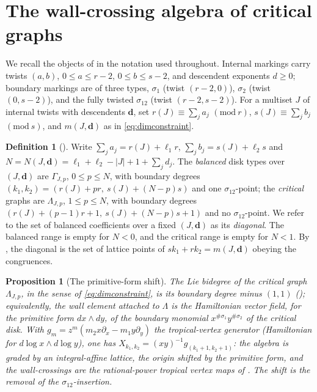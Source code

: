 \documentclass[11pt]{amsart}
\newtheorem{proposition}[theorem]{Proposition}
\theoremstyle{definition}
\newtheorem{definition}[theorem]{Definition}
\theoremstyle{remark}
\begin{document}
\section{The wall-crossing algebra of critical graphs}
\label{sec:algebra}

We recall the objects of \cite[\S2.4, \S4.3]{GKT} in the notation used throughout.
Internal markings carry twists $(a,b)$, $0\le a\le r-2$, $0\le b\le s-2$, and
descendent exponents $d\ge0$; boundary markings are of three types,
$\sigma_{1}$ (twist $(r{-}2,0)$), $\sigma_{2}$ (twist $(0,s{-}2)$), and the fully
twisted $\sigma_{12}$ (twist $(r{-}2,s{-}2)$). For a multiset $J$ of internal
twists with descendents $\mathbf d$, set $r(J)\equiv\sum_{j}a_{j}$
$(\mathrm{mod}\ r)$, $s(J)\equiv\sum_{j}b_{j}$ $(\mathrm{mod}\ s)$, and
$m(J,\mathbf d)$ as in \eqref{eq:dimconstraint}.

\begin{definition}[{\cite[Not.~2.40]{GKT}}]
\label{def:diagonal}
Write $\sum_{j}a_{j}=r(J)+\ell_{1}r$, $\sum_{j}b_{j}=s(J)+\ell_{2}s$ and
$N=N(J,\mathbf d)=\ell_{1}+\ell_{2}-|J|+1+\sum_{j}d_{j}$. The \emph{balanced}
disk types over $(J,\mathbf d)$ are $\Gamma_{J,p}$, $0\le p\le N$, with boundary
degrees $(k_{1},k_{2})=(r(J)+pr,\ s(J)+(N{-}p)s)$ and one $\sigma_{12}$-point; the
\emph{critical} graphs are $\Lambda_{J,p}$, $1\le p\le N$, with boundary degrees
$(r(J)+(p{-}1)r+1,\ s(J)+(N{-}p)s+1)$ and no $\sigma_{12}$-point. We refer to the
set of balanced coefficients over a fixed $(J,\mathbf d)$ as its \emph{diagonal}.
The balanced range is empty for $N<0$, and the critical range is empty for
$N<1$. By \cite[Prop.~2.31]{GKT}, the diagonal is the set of lattice points of
$sk_{1}+rk_{2}=m(J,\mathbf d)$ obeying the congruences.
\end{definition}

\begin{proposition}[The primitive-form shift]
\label{prop:shift}
The Lie bidegree of the critical graph $\Lambda_{J,p}$, in the sense of
\eqref{eq:dimconstraint}, is its boundary degree minus $(1,1)$
(\cite[Prop.~2.39]{GKT}); equivalently, the wall element attached to $\Lambda$ is
the Hamiltonian vector field, for the primitive form $dx\wedge dy$, of the boundary
monomial $x^{\#\sigma_{1}}y^{\#\sigma_{2}}$ of the critical disk. With
$g_{m}=z^{m}(m_{2}x\partial_{x}-m_{1}y\partial_{y})$ the tropical-vertex generator
(Hamiltonian for $d\log x\wedge d\log y$), one has
$X_{k_{1},k_{2}}=(xy)^{-1}g_{(k_{1}+1,k_{2}+1)}$: the algebra is graded by an
integral-affine lattice, the origin shifted by the primitive form, and the
wall-crossings are the rational-power tropical vertex maps of
\cite[Lem.~4.21]{GKT}. The shift is the removal of the $\sigma_{12}$-insertion.
\end{proposition}
\end{document}

